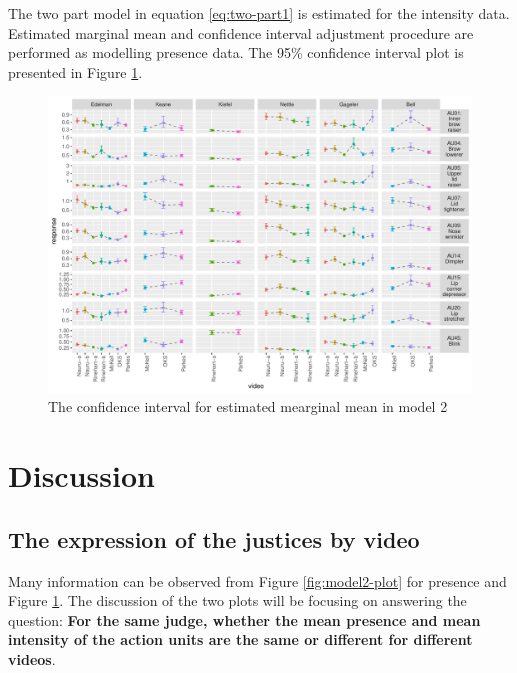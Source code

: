 \documentclass{monashthesis}
\begin{document}
The two part model in equation \ref{eq:two-part1} is estimated for the intensity data. Estimated marginal mean and confidence interval adjustment procedure are performed as modelling presence data. The 95\% confidence interval plot is presented in Figure \ref{fig:intensity-video}.

\begin{figure}

{\centering \includegraphics[width=1\linewidth]{figures/intensity-video-1} 

}

\caption{The confidence interval for estimated mearginal mean in model 2}\label{fig:intensity-video}
\end{figure}

\hypertarget{discussion}{%
\section{Discussion}\label{discussion}}

\hypertarget{the-expression-of-the-justices-by-video}{%
\subsection{The expression of the justices by video}\label{the-expression-of-the-justices-by-video}}

Many information can be observed from Figure \ref{fig:model2-plot} for presence and Figure \ref{fig:intensity-video}. The discussion of the two plots will be focusing on answering the question: \textbf{For the same judge, whether the mean presence and mean intensity of the action units are the same or different for different videos}.
\end{document}
